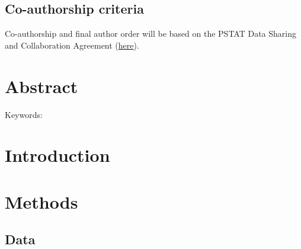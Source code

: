\documentclass{article}
\begin{document}
% 


\subsection{Co-authorship criteria}
Co-authorship and final author order will be based on the PSTAT Data Sharing and Collaboration Agreement (\href{https://docs.google.com/document/d/1AXIhq6lO_qOPf7q67s_SiDOD6qEfih0COtxQZo7v-Hc/edit?usp=sharing}{here}).


\section{Abstract}

\noindent Keywords: 

\section{Introduction}


\section{Methods}

\subsection{Data}
\end{document}
